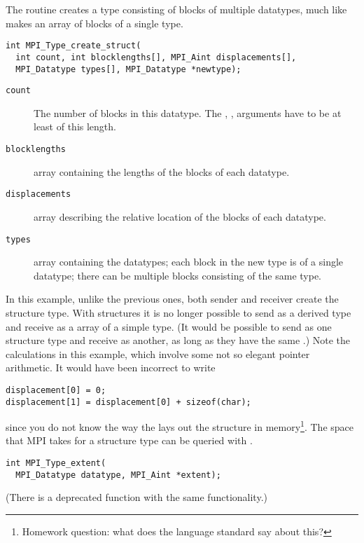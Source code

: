 The  routine creates
a type consisting of blocks of multiple datatypes,
much like  makes
an array of blocks of a single type.
\begin{verbatim}
int MPI_Type_create_struct(
  int count, int blocklengths[], MPI_Aint displacements[],
  MPI_Datatype types[], MPI_Datatype *newtype);
\end{verbatim}
\begin{description}
\item[\texttt{count}] The number of blocks in this
  datatype. The , , 
  arguments have to be at least of this length.
\item[\texttt{blocklengths}] array containing the lengths of the blocks of each datatype.
\item[\texttt{displacements}] array describing the relative location
  of the blocks of each datatype.
\item[\texttt{types}] array containing the datatypes; each block in
  the new type is of a single datatype; there can be multiple
  blocks consisting of the same type.
\end{description}
In this example, unlike the previous ones, both sender and receiver
create the structure type. With structures it is no longer possible to
send as a derived type and receive as a array of a simple type.
(It would be possible to send as one structure type and receive as another, 
as long as they have the same .)
Note the  calculations in this example,
which involve some not so elegant pointer arithmetic.
It would have been incorrect to write
\begin{verbatim}
displacement[0] = 0;
displacement[1] = displacement[0] + sizeof(char);
\end{verbatim}
since you do not know the way the  lays out the
structure in memory\footnote{Homework question: what does the language
  standard say about this?}.
The space that MPI takes for a structure type can be queried 
with .

\begin{verbatim}
int MPI_Type_extent(
  MPI_Datatype datatype, MPI_Aint *extent);
\end{verbatim}

(There is a deprecated function  with the same
functionality.)


